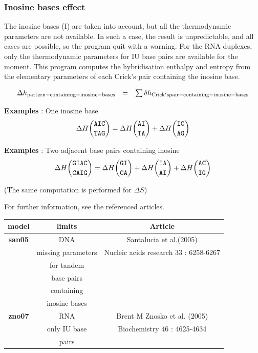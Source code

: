 \documentclass{article}
\begin{document}
\subsubsection{Inosine bases effect}

The inosine bases (I) are taken into account, but all the thermodynamic parameters are not available. 
In such a case, the result is unpredictable, and all cases are possible, so the
program quit with a warning. For the RNA duplexes, only the thermodynamic parameters
for IU base pairs are available for the moment.
This program computes the hybridisation enthalpy and entropy from the elementary 
parameters of each Crick's pair containing the inosine base.

\begin{displaymath}
  \begin{array}[t]{ccc}
  \Delta{}h_\mathrm{pattern-containing-inosine-bases}&=&\sum
  \delta{}h_\mathrm{Crick's pair-containing-inosine-bases}\\
  \end{array}
\end{displaymath}

\textbf{Examples} : One inosine base
\begin{multline*}
\Delta H {\mbox{\texttt{AIC}} \choose \mbox{\texttt{TAG}}} = 
\Delta H {\mbox{\texttt{AI}} \choose \mbox{\texttt{TA}}} +
\Delta H {\mbox{\texttt{IC}} \choose \mbox{\texttt{AG}}}\\
\end{multline*}

\textbf{Examples} : Two adjacent base pairs containing inosine
\begin{multline*}
\Delta H {\mbox{\texttt{GIAC}} \choose \mbox{\texttt{CAIG}}} = 
\Delta H {\mbox{\texttt{GI}} \choose \mbox{\texttt{CA}}} +
\Delta H {\mbox{\texttt{IA}} \choose \mbox{\texttt{AI}}} +
\Delta H {\mbox{\texttt{AC}} \choose \mbox{\texttt{IG}}}\\
\end{multline*}

       (The same computation is performed for $\Delta S$) 
       
For further information, see the referenced articles.

\begin{table}[h][c]
\begin{tabular}[h]{| c | c | c |}
\textbf{model} & \textbf{limits} & \textbf{Article} \\
\hline
\textbf{san05} & DNA & Santalucia et al.(2005)\\
 & missing parameters & Nucleic acids research 33 : 6258-6267 \\
 & for tandem & \\
 & base pairs & \\
 & containing & \\
 & inosine bases & \\
 \hline
\textbf{zno07} & RNA & Brent M Znosko et al. (2005)\\
 & only IU base & Biochemistry 46 : 4625-4634 \\
 & pairs & \\
 \hline
\end{tabular}
\end{table}
\end{document}
